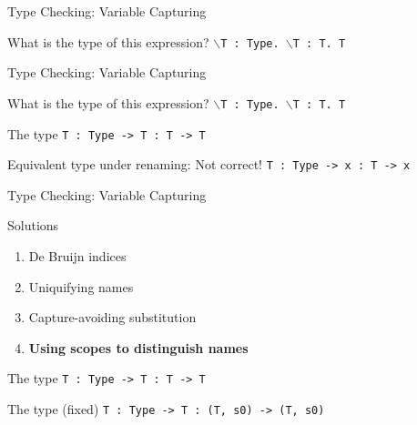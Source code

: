 \documentclass[aspectratio=43]{beamer}
\begin{document}
\begin{frame}[fragile]{Type Checking: Variable Capturing}
	\begin{exampleblock}{What is the type of this expression?}
		\texttt{$\backslash$T : Type. $\backslash$T : T. T}
	\end{exampleblock}
\end{frame}

\begin{frame}[fragile]{Type Checking: Variable Capturing}
	\begin{exampleblock}{What is the type of this expression?}
		\texttt{$\backslash$T : Type. $\backslash$T : T. T}
	\end{exampleblock}
	
	\begin{block}{The type}
		\texttt{T : Type -> T : T -> T}
	\end{block}
	
	\begin{block}{Equivalent type under renaming: Not correct!}
		\texttt{T : Type -> x : T -> x}
	\end{block}
\end{frame}

\begin{frame}[fragile]{Type Checking: Variable Capturing}
	\begin{block}{Solutions}
		\begin{enumerate}
			\item De Bruijn indices
			\item Uniquifying names
			\item Capture-avoiding substitution
			\item \textbf{Using scopes to distinguish names}
		\end{enumerate}
	\end{block}
	
	\begin{block}{The type}
		\texttt{T : Type -> T : T -> T}
	\end{block}
	
	\begin{block}{The type (fixed)}
		\texttt{T : Type -> T : (T, s0) -> (T, s0)}
	\end{block}
\end{frame}
\end{document}
